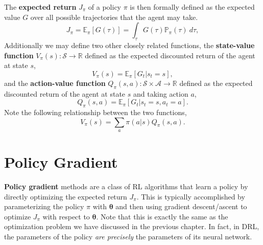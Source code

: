 \documentclass[12pt]{report}
\theoremstyle{definition}
\theoremstyle{remark}
\begin{document}
The \textbf{expected return} $J_\pi$ of a policy $\pi$ is then formally defined as the expected value $G$ over all possible trajectories that the agent may take.
\begin{equation}\label{eq:expected-return}
    J_\pi = \mathbb{E}_\pi[G(\tau)] = \int_{\tau} G(\tau)\mathbb{P}_\pi(\tau)\ d\tau,
\end{equation}
Additionally we may define two other closely related functions, the \textbf{state-value function} $V_\pi(s): \mathcal{S} \to \mathbb{R}$ defined as the expected discounted return of the agent at state $s$,
\begin{equation}
    V_\pi(s) = \mathbb{E}_\pi[G_t | s_t = s],
\end{equation}
and the \textbf{action-value function} $Q_\pi(s, a): \mathcal{S} \times \mathcal{A} \to \mathbb{R}$ defined as the expected discounted return of the agent at state $s$ and taking action $a$,
\begin{equation}
    Q_\pi(s, a) = \mathbb{E}_\pi[G_t | s_t = s, a_t = a].
\end{equation}
Note the following relationship between the two functions,
\begin{equation}
    V_\pi(s) = \sum_a \pi(a | s) Q_\pi(s, a).
\end{equation}

\section{Policy Gradient}
\textbf{Policy gradient} methods are a class of RL algorithms that learn a policy by directly optimizing the expected return $J_\pi$. This is typically accomplished by parameterizing the policy $\pi$ with $\boldsymbol{\theta}$ and then using gradient descent/ascent to optimize $J_\pi$ with respect to $\boldsymbol{\theta}$. Note that this is exactly the same as the optimization problem we have discussed in the previous chapter. In fact, in DRL, the parameters of the policy \textit{are precisely} the parameters of its neural network.
\end{document}
